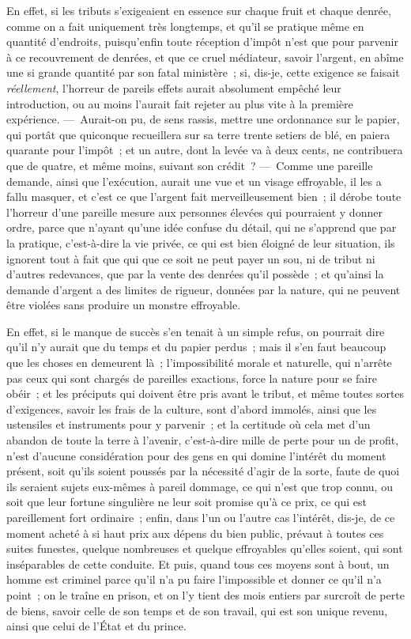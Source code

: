 \documentclass[french,twoside]{book} %
\begin{document}
En effet, si les tributs s’exigeaient en essence sur chaque fruit et chaque denrée, comme on a fait uniquement très longtemps, et qu’il se pratique même en quantité d’endroits, puisqu’enfin toute réception d’impôt n’est que pour parvenir à ce recouvrement de denrées, et que ce cruel médiateur, savoir l’argent, en abîme une si grande quantité par son fatal ministère ; si, dis-je, cette exigence se faisait {\itshape réellement}, l’horreur de pareils effets aurait absolument empêché leur introduction, ou au moins l’aurait fait rejeter au plus vite à la première expérience. — Aurait-on pu, de sens rassis, mettre une ordonnance sur le papier, qui portât que quiconque recueillera sur sa terre trente setiers de blé, en paiera quarante pour l’impôt ; et un autre, dont la levée va à deux cents, ne contribuera que de quatre, et même moins, suivant son crédit ? — Comme une pareille demande, ainsi que l’exécution, aurait une vue et un visage effroyable, il les a fallu masquer, et c’est ce que l’argent fait merveilleusement bien ; il dérobe toute l’horreur d’une pareille mesure aux personnes élevées qui pourraient y donner ordre, parce que n’ayant qu’une idée confuse du détail, qui ne s’apprend que par la pratique, c’est-à-dire la vie privée, ce qui est bien éloigné de leur situation, ils ignorent tout à fait que qui que ce soit ne peut payer un sou, ni de tribut ni d’autres redevances, que par la vente des denrées qu’il possède ; et qu’ainsi la demande d’argent a des limites de rigueur, données par la nature, qui ne peuvent être violées sans produire un monstre effroyable.\par
En effet, si le manque de succès s’en tenait à un simple refus, on pourrait dire qu’il n’y aurait que du temps et du papier perdus ; mais il s’en faut beaucoup que les choses en demeurent là ; l’impossibilité morale et naturelle, qui n’arrête pas ceux qui sont chargés de pareilles exactions, force la nature pour se faire obéir ; et les préciputs qui doivent être pris avant le tribut, et même toutes sortes d’exigences, savoir les frais de la culture, sont d’abord immolés, ainsi que les ustensiles et instruments pour y parvenir ; et la certitude où cela met d’un abandon de toute la terre à l’avenir, c’est-à-dire mille de perte pour un de profit, n’est d’aucune considération pour des gens en qui domine l’intérêt du moment présent, soit qu’ils soient poussés par la nécessité d’agir de la sorte, faute de quoi ils seraient sujets eux-mêmes à pareil dommage, ce qui n’est que trop connu, ou soit que leur fortune singulière ne leur soit promise qu’à ce prix, ce qui est pareillement fort ordinaire ; enfin, dans l’un ou l’autre cas l’intérêt, dis-je, de ce moment acheté à si haut prix aux dépens du bien public, prévaut à toutes ces suites funestes, quelque nombreuses et quelque effroyables qu’elles soient, qui sont inséparables de cette conduite. Et puis, quand tous ces moyens sont à bout, un homme est criminel parce qu’il n’a pu faire l’impossible et donner ce qu’il n’a point ; on le traîne en prison, et on l’y tient des mois entiers par surcroît de perte de biens, savoir celle de son temps et de son travail, qui est son unique revenu, ainsi que celui de l’État et du prince.\par
\end{document}
